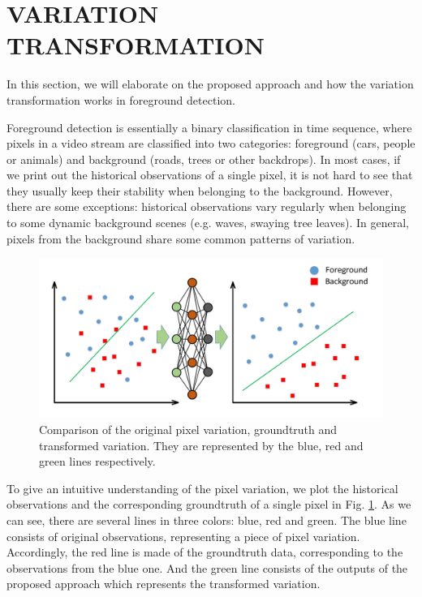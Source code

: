 \documentclass[journal]{IEEEtran}
\newcommand{\reffig}[1]{Fig. \ref{#1}}
\begin{document}
\section{VARIATION TRANSFORMATION}
\label{sec3}
In this section, we will elaborate on the proposed approach and how the variation transformation works in foreground detection.

Foreground detection is essentially a binary classification in time sequence, 
where pixels in a video stream are classified into two categories: foreground (cars, people or animals) and background (roads, trees or other backdrops).
%
In most cases, if we print out the historical observations of a single pixel, 
it is not hard to see that they usually keep their stability when belonging to the background.
%
However, there are some exceptions: historical observations vary regularly when belonging to some dynamic background scenes (e.g. waves, swaying tree leaves).
%
In general, pixels from the background share some common patterns of variation.
\begin{figure}[!t]	%
\centering
    \includegraphics[width=\linewidth]{figure/fig1}
    \caption{Comparison of the original pixel variation, groundtruth and transformed variation. They are represented by the blue, red and green lines respectively.}
    \label{variation_chart}
\end{figure}

To give an intuitive understanding of the pixel variation, we plot the historical observations and the corresponding groundtruth of a single pixel in  \reffig{variation_chart}.
As we can see, there are several lines in three colors: blue, red and green. 
The blue line consists of original observations, representing a piece of pixel variation. 
Accordingly, the red line is made of the groundtruth data, corresponding to the observations from the blue one.  
And the green line consists of the outputs of the proposed approach which represents the transformed variation. 
\end{document}
